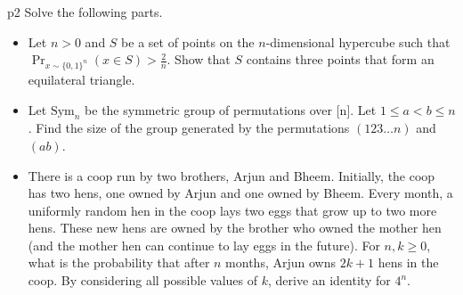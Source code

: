 \documentclass[a4paper, 11pt]{article}
\newcounter{problem}
\begin{document}
\begin{problem}{%
	}{p2%
	}
Solve the following parts.
\begin{itemize}
	\item Let $n>0$ and $S$ be a set of points on the $n$-dimensional hypercube such that $\operatorname{Pr}_{x \sim\{0,1\}^n}(x \in S)>\frac{2}{n}$. Show that $S$ contains three points that form an equilateral triangle.
\item Let $\mathrm{Sym}_n$ be the symmetric group of permutations over [n]. Let $1 \leq a<b \leq n$. Find the size of the group generated by the permutations $(123 \ldots n)$ and $(a b)$.
\item There is a coop run by two brothers, Arjun and Bheem. Initially, the coop has two hens, one owned by Arjun and one owned by Bheem. Every month, a uniformly random hen in the coop lays two eggs that grow up to two more hens. These new hens are owned by the brother who owned the mother hen (and the mother hen can continue to lay eggs in the future). For $n, k \geq 0$, what is the probability that after $n$ months, Arjun owns $2 k+1$ hens in the coop. By considering all possible values of $k$, derive an identity for $4^n$.
\end{itemize}
\end{problem}
\end{document}
